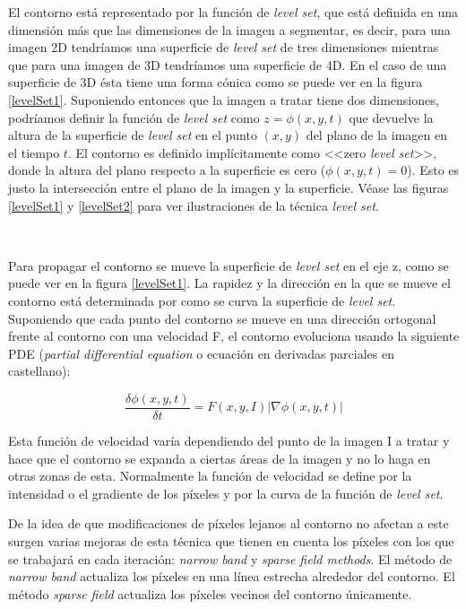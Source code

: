 El contorno est\'{a} representado por la funci\'{o}n de \textit{level set}, que est\'{a} definida en una dimensi\'{o}n m\'{a}s que las dimensiones de la imagen a segmentar, es decir, para una imagen 2D tendr\'{i}amos una superficie de \textit{level set} de tres dimensiones mientras que para una imagen de 3D tendr\'{i}amos una superficie de 4D. En el caso de una superficie de 3D \'{e}sta tiene una forma c\'{o}nica como se puede ver en la figura \ref{levelSet1}. Suponiendo entonces que la imagen a tratar tiene dos dimensiones, podr\'{i}amos definir la funci\'{o}n de \textit{level set} como $z = \phi(x,y,t)$ que devuelve la altura de la superficie de \textit{level set} en el punto $(x,y)$ del plano de la imagen en el tiempo $t$. El contorno es definido impl\'{i}citamente como <<zero \textit{level set}>>, donde la altura del plano respecto a la superficie es cero ($\phi(x,y,t) = 0$). Esto es justo la intersecci\'{o}n entre el plano de la imagen y la superficie. V\'{e}ase las figuras \ref{levelSet1} y \ref{levelSet2} para ver ilustraciones de la t\'{e}cnica \textit{level set}.

\

Para propagar el contorno se mueve la superficie de \textit{level set} en el eje z, como se puede ver en la figura \ref{levelSet1}. La rapidez y la direcci\'{o}n en la que se mueve el contorno est\'{a} determinada por como se curva la superficie de \textit{level set}. Suponiendo que cada punto del contorno se mueve en una direcci\'{o}n ortogonal frente al contorno con una velocidad F, el contorno evoluciona usando la siguiente PDE (\textit{partial differential equation} o ecuaci\'{o}n en derivadas parciales en castellano):

\begin{equation}
\frac{\delta \phi(x,y,t)}{\delta t} = F(x,y,I) |\nabla \phi(x,y,t)|
\end{equation}

Esta funci\'{o}n de velocidad var\'{i}a dependiendo del punto de la imagen I a tratar y hace que el contorno se expanda a ciertas \'{a}reas de la imagen y no lo haga en otras zonas de esta. Normalmente la funci\'{o}n de velocidad se define por la intensidad o el gradiente de los p\'{i}xeles y por la curva de la funci\'{o}n de \textit{level set}.

De la idea de que modificaciones de p\'{i}xeles lejanos al contorno no afectan a este surgen varias mejoras de esta t\'{e}cnica que tienen en cuenta los p\'{i}xeles con los que se trabajar\'{a} en cada iteraci\'{o}n: \textit{narrow band} y \textit{sparse field methods}. El m\'{e}todo de \textit{narrow band} actualiza los p\'{i}xeles en una l\'{i}nea estrecha alrededor del contorno. El m\'{e}todo \textit{sparse field} actualiza los p\'{i}xeles vecinos del contorno \'{u}nicamente.

